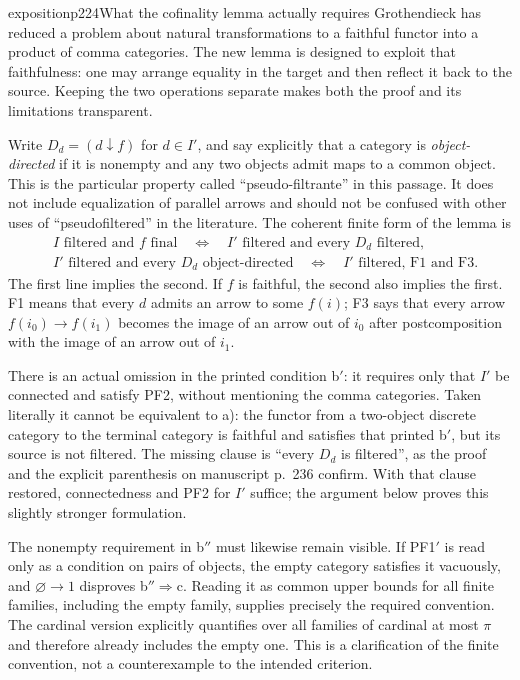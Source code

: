 \begin{dcomment}{exposition}{p224}{What the cofinality lemma actually requires}
Grothendieck has reduced a problem about natural transformations to a faithful functor into a product of comma categories.  The new lemma is designed to exploit that faithfulness: one may arrange equality in the target and then reflect it back to the source.  Keeping the two operations separate makes both the proof and its limitations transparent.

Write $D_d=(d\downarrow f)$ for $d\in I'$, and say explicitly that a category is \emph{object-directed} if it is nonempty and any two objects admit maps to a common object.  This is the particular property called ``pseudo-filtrante'' in this passage.  It does not include equalization of parallel arrows and should not be confused with other uses of ``pseudofiltered'' in the literature.  The coherent finite form of the lemma is
\[
 \begin{split}
 &I\text{ filtered and }f\text{ final}\quad\Longleftrightarrow\quad
 I'\text{ filtered and every }D_d\text{ filtered},\\
 &I'\text{ filtered and every }D_d\text{ object-directed}
 \quad\Longleftrightarrow\quad I'\text{ filtered, F1 and F3}.
 \end{split}
\]
The first line implies the second.  If $f$ is faithful, the second also implies the first.  F1 means that every $d$ admits an arrow to some $f(i)$; F3 says that every arrow $f(i_0)\to f(i_1)$ becomes the image of an arrow out of $i_0$ after postcomposition with the image of an arrow out of $i_1$.

There is an actual omission in the printed condition b$'$: it requires only that $I'$ be connected and satisfy PF2, without mentioning the comma categories.  Taken literally it cannot be equivalent to a): the functor from a two-object discrete category to the terminal category is faithful and satisfies that printed b$'$, but its source is not filtered.  The missing clause is ``every $D_d$ is filtered'', as the proof and the explicit parenthesis on manuscript p.~236 confirm.  With that clause restored, connectedness and PF2 for $I'$ suffice; the argument below proves this slightly stronger formulation.

The nonempty requirement in b$''$ must likewise remain visible.  If PF1$'$ is read only as a condition on pairs of objects, the empty category satisfies it vacuously, and $\varnothing\to1$ disproves b$''\Rightarrow$c.  Reading it as common upper bounds for all finite families, including the empty family, supplies precisely the required convention.  The cardinal version explicitly quantifies over all families of cardinal at most $\pi$ and therefore already includes the empty one.  This is a clarification of the finite convention, not a counterexample to the intended criterion.
\end{dcomment}


